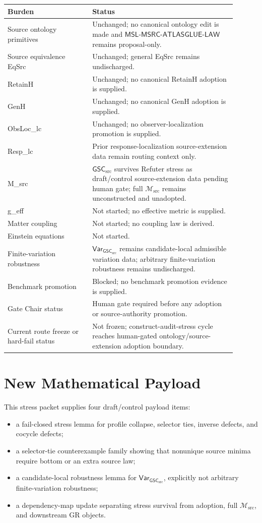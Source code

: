 \documentclass[11pt]{article}
\newcommand{\Msrc}{\mathcal{M}_{\mathrm{src}}}
\newcommand{\MSL}{\mathsf{MSL}\mbox{-}\mathsf{MSRC}\mbox{-}\mathsf{ATLASGLUE}\mbox{-}\mathsf{LAW}}
\newcommand{\GSC}{\mathsf{GSC}_{\mathrm{src}}}
\newcommand{\Vargsc}{\mathsf{Var}_{\GSC}}
\begin{document}
\begin{center}
\begin{tabular}{p{0.33\linewidth}p{0.57\linewidth}}
\hline
Burden & Status \\
\hline
Source ontology primitives & Unchanged; no canonical ontology edit is made and \(\MSL\) remains proposal-only. \\
Source equivalence EqSrc & Unchanged; general EqSrc remains undischarged. \\
RetainH & Unchanged; no canonical RetainH adoption is supplied. \\
GenH & Unchanged; no canonical GenH adoption is supplied. \\
ObsLoc\_lc & Unchanged; no observer-localization promotion is supplied. \\
Resp\_lc & Prior response-localization source-extension data remain routing context only. \\
M\_src & \(\GSC\) survives Refuter stress as draft/control source-extension data pending human gate; full \(\Msrc\) remains unconstructed and unadopted. \\
g\_eff & Not started; no effective metric is supplied. \\
Matter coupling & Not started; no coupling law is derived. \\
Einstein equations & Not started. \\
Finite-variation robustness & \(\Vargsc\) remains candidate-local admissible variation data; arbitrary finite-variation robustness remains undischarged. \\
Benchmark promotion & Blocked; no benchmark promotion evidence is supplied. \\
Gate Chair status & Human gate required before any adoption or source-authority promotion. \\
Current route freeze or hard-fail status & Not frozen; construct-audit-stress cycle reaches human-gated ontology/source-extension adoption boundary. \\
\hline
\end{tabular}
\end{center}

\section{New Mathematical Payload}

This stress packet supplies four draft/control payload items:
\begin{itemize}
  \item a fail-closed stress lemma for profile collapse, selector ties,
  inverse defects, and cocycle defects;
  \item a selector-tie counterexample family showing that nonunique source
  minima require bottom or an extra source law;
  \item a candidate-local robustness lemma for \(\Vargsc\), explicitly not
  arbitrary finite-variation robustness;
  \item a dependency-map update separating stress survival from adoption,
  full \(\Msrc\), and downstream GR objects.
\end{itemize}
\end{document}
